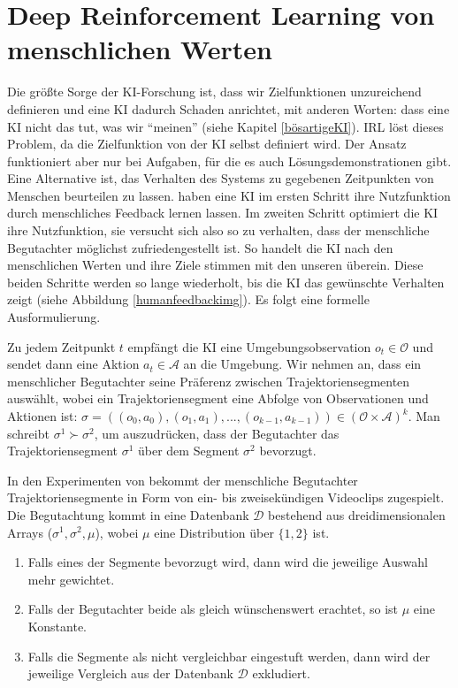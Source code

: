 \section{Deep Reinforcement Learning von menschlichen Werten}
Die größte Sorge der KI-Forschung ist, dass wir Zielfunktionen unzureichend definieren und eine KI dadurch Schaden anrichtet, mit anderen Worten: dass eine KI nicht das tut, was wir \enquote{meinen} (siehe Kapitel \ref{bösartigeKI}). IRL löst dieses Problem, da die Zielfunktion von der KI selbst definiert wird. Der Ansatz funktioniert aber nur bei Aufgaben, für die es auch Lösungsdemonstrationen gibt. Eine Alternative ist, das Verhalten des Systems zu gegebenen Zeitpunkten von Menschen beurteilen zu lassen. \citeauthor{christiano_deep_2017} haben eine KI im ersten Schritt ihre Nutzfunktion durch menschliches Feedback lernen lassen. Im zweiten Schritt optimiert die KI ihre Nutzfunktion, sie versucht sich also so zu verhalten, dass der menschliche Begutachter möglichst zufriedengestellt ist. So handelt die KI nach den menschlichen Werten und ihre Ziele stimmen mit den unseren überein. Diese beiden Schritte werden so lange wiederholt, bis die KI das gewünschte Verhalten zeigt (siehe Abbildung \ref{humanfeedbackimg}).  Es folgt eine formelle Ausformulierung.

Zu jedem Zeitpunkt $t$ empfängt die KI eine Umgebungsobservation $o_t \in \mathcal{O}$ und sendet dann eine Aktion $a_t \in \mathcal{A}$ an die Umgebung. Wir nehmen an, dass ein menschlicher Begutachter seine Präferenz zwischen Trajektoriensegmenten auswählt, wobei ein Trajektoriensegment eine Abfolge von Observationen und Aktionen ist: $\sigma = ((o_0,a_0),(o_1,a_1),...,(o_{k-1},a_{k-1})) \in (\mathcal{O} \times \mathcal{A})^k$. Man schreibt $\sigma^1 \succ \sigma^2$, um auszudrücken, dass der Begutachter das Trajektoriensegment $\sigma^1$ über dem Segment $\sigma^2$ bevorzugt. 

In den Experimenten von \citeauthor{christiano_deep_2017} bekommt der menschliche Begutachter Trajektoriensegmente in Form von ein- bis zweisekündigen Videoclips zugespielt. Die Begutachtung kommt in eine Datenbank $\mathcal{D}$ bestehend aus dreidimensionalen Arrays ($\sigma^1,\sigma^2,\mu$), wobei $\mu$ eine Distribution über $\{1,2\}$ ist.

\begin{enumerate}
\item Falls eines der Segmente bevorzugt wird, dann wird die jeweilige Auswahl mehr gewichtet.
\item Falls der Begutachter beide als gleich wünschenswert erachtet, so ist $\mu$ eine Konstante.
\item Falls die Segmente als nicht vergleichbar eingestuft werden, dann wird der jeweilige Vergleich aus der Datenbank $\mathcal{D}$ exkludiert.
\end{enumerate}
  
